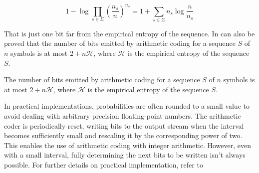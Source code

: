 \begin{equation}
    1 - \log \prod_{s \in \Sigma} \left (\frac{n_s}{n} \right)^{n_s} = 1 + \sum_{s \in \Sigma} n_s \log \frac{n}{n_s}
\end{equation}

\noindent That is just one bit far from the empirical entropy of the sequence. In can also be proved \cite{ferragina2023pearls, han2002mathematics, sayood2002lossless} that the number of bits emitted by arithmetic coding for a sequence $S$ of $n$ symbols is at most $2 + n\mathcal{H}$, where $\mathcal{H}$ is the empirical entropy of the sequence $S$.

\begin{theorem}
    The number of bits emitted by arithmetic coding for a sequence $S$ of $n$ symbols is at most $2 + n\mathcal{H}$, where $\mathcal{H}$ is the empirical entropy of the sequence $S$.
\end{theorem}


\begin{remark}
    In practical implementations, probabilities are often rounded to a small value to avoid dealing with arbitrary precision floating-point numbers. The arithmetic coder is periodically reset, writing bits to the output stream when the interval becomes sufficiently small and rescaling it by the corresponding power of two. This enables the use of arithmetic coding with integer arithmetic. However, even with a small interval, fully determining the next bits to be written isn't always possible. For further details on practical implementation, refer to \cite{moffat1998arithmetic}
\end{remark}
